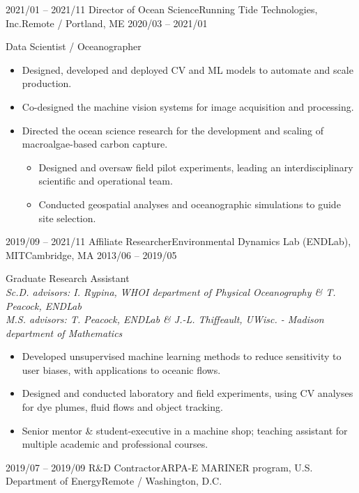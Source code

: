 \begin{experiences}
    \experience
    {2021/01 -- 2021/11} {Director of Ocean Science}{Running Tide Technologies, Inc.}{Remote / Portland, ME}
    {2020/03 -- 2021/01}    {
    \normalsize{Data Scientist / Oceanographer}
    \small
    \begin{itemize}
    \item Designed, developed and deployed CV and ML models to automate and scale production.
 \item Co-designed the machine vision systems for image acquisition and processing.
    \item Directed the ocean science research for the development and scaling of macroalgae-based carbon capture.
    \begin{itemize}
	\item Designed and oversaw field pilot experiments, leading an %
 interdisciplinary scientific and operational team.
	\item Conducted geospatial analyses and oceanographic simulations to guide site selection.
        \end{itemize}
    \end{itemize}
                    }
        {}
        
    \experience
    {2019/09 -- 2021/11} {Affiliate Researcher}{Environmental Dynamics Lab (ENDLab),  MIT}{Cambridge, MA}
    {2013/06 -- 2019/05}    {
    \normalsize{Graduate Research Assistant}
    \small
    \\\emph{Sc.D. advisors: I. Rypina, WHOI department of Physical Oceanography \& T. Peacock, ENDLab}
\\\emph{M.S. advisors: T. Peacock, ENDLab \& J.-L. Thiffeault, UWisc. - Madison department of Mathematics}
    
\begin{itemize}
    \item Developed unsupervised machine learning methods to reduce sensitivity to user biases, with applications to oceanic flows.
    \item Designed and conducted laboratory and field experiments, using CV analyses for dye plumes, fluid flows and object tracking.
    \item Senior mentor \& student-executive in a machine shop; teaching assistant for multiple academic and professional courses.
 \end{itemize}
                    }
        {}

    \experience
    {2019/07 -- 2019/09} {R\&D Contractor}{ARPA-E MARINER program, U.S. Department of Energy}{Remote / Washington, D.C.}
    { }    {
    
}
\end{experiences}
